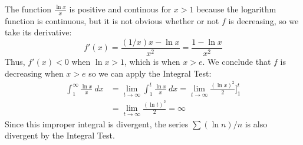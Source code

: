   \begin{solution}
    The function $\frac{\ln x}{x}$ is positive and continous for $x>1$ because the logarithm function is continuous, but it is not obvious whether or not $f$ is decreasing, so we take its derivative:
    $$ f'(x) = \frac{(1/x)x - \ln x}{x^2} = \frac{1-\ln x}{x^2}$$
    Thus, $f'(x) < 0$ when $\ln x > 1$, which is when $x > e$. We conclude that $f$ is decreasing when $x > e$ so we can apply the Integral Test:
    \begin{align*}
      \int_{1}^{\infty} \frac{\ln x}{x}\ dx &= \lim_{t\to\infty} \int_{1}^{t}\frac{\ln x}{x}\ dx = \lim_{t\to\infty} \frac{(\ln x)^2}{2}\Bigg]_{1}^{t} \\
      &= \lim_{t\to\infty} \frac{(\ln t)^2}{2} = \infty
    \end{align*}
    Since this improper integral is divergent, the series $\sum (\ln n)/n$ is also divergent by the Integral Test.
  \end{solution}
